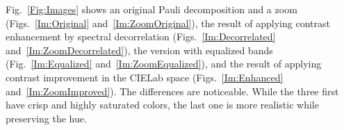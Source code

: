 \documentclass{article}
\begin{document}
Fig.~\ref{Fig:Images} shows an original Pauli decomposition and a zoom (Figs.~\ref{Im:Original} and~\ref{Im:ZoomOriginal}),
the result of applying contrast enhancement by spectral decorrelation (Figs.~\ref{Im:Decorrelated} and~\ref{Im:ZoomDecorrelated}),
the version with equalized bands (Fig.~\ref{Im:Equalized} and~\ref{Im:ZoomEqualized}),
and the result of applying contrast improvement in the CIELab space (Figs.~\ref{Im:Enhanced} and~\ref{Im:ZoomImproved}).
The differences are noticeable.
While the three first have crisp and highly saturated colors, the last one is more realistic while preserving the hue.

\begin{figure}[hbt]
\centering
{}

\end{figure}
\end{document}
